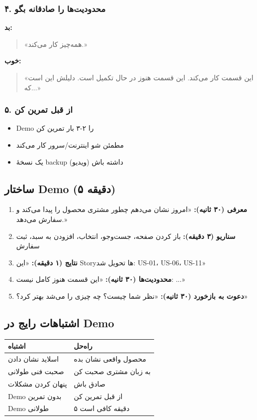 \documentclass[12pt, a4paper]{article}
\begin{document}
\subsubsection{۴. محدودیت‌ها را صادقانه بگو}

\textbf{بد:}
\begin{quote}
«همه‌چیز کار می‌کند.»
\end{quote}

\textbf{خوب:}
\begin{quote}
«این قسمت کار می‌کند. این قسمت هنوز در حال تکمیل است. دلیلش این است که...»
\end{quote}

\subsubsection{۵. از قبل تمرین کن}
\begin{itemize}
    \item Demo را ۲-۳ بار تمرین کن
    \item مطمئن شو اینترنت/سرور کار می‌کند
    \item یک نسخهٔ backup (ویدیو) داشته باش
\end{itemize}

\subsection{ساختار Demo (۵ دقیقه)}

\begin{enumerate}
    \item \textbf{معرفی (۳۰ ثانیه):} «امروز نشان می‌دهم چطور مشتری محصول را 
پیدا می‌کند و سفارش می‌دهد.»
    \item \textbf{سناریو (۳ دقیقه):} باز کردن صفحه، جست‌وجو، انتخاب، افزودن 
به سبد، ثبت سفارش
    \item \textbf{نتایج (۱ دقیقه):} «این Storyها تحویل شد: US-01، US-06، 
US-11»
    \item \textbf{محدودیت‌ها (۳۰ ثانیه):} «این قسمت هنوز کامل نیست: ...»
    \item \textbf{دعوت به بازخورد (۳۰ ثانیه):} «نظر شما چیست؟ چه چیزی را 
می‌شد بهتر کرد؟»
\end{enumerate}

\subsection{اشتباهات رایج در Demo}

\begin{center}
\begin{tabular}{|l|l|}
\hline
\textbf{اشتباه} & \textbf{راه‌حل} \\
\hline
اسلاید نشان دادن & محصول واقعی نشان بده \\
\hline
صحبت فنی طولانی & به زبان مشتری صحبت کن \\
\hline
پنهان کردن مشکلات & صادق باش \\
\hline
Demo بدون تمرین & از قبل تمرین کن \\
\hline
Demo طولانی & ۵ دقیقه کافی است \\
\hline
\end{tabular}
\end{center}
\end{document}
